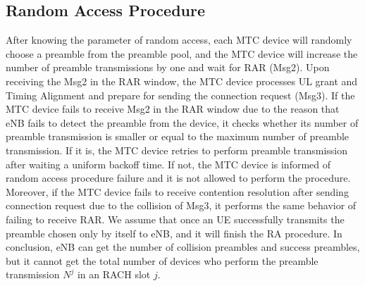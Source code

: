     \subsection{Random Access Procedure}
    After knowing the parameter of random access, each MTC device will randomly choose a preamble from the preamble pool, and the MTC device will increase the number of preamble transmissions by one and wait for RAR (Msg2). Upon receiving the Msg2 in the RAR window, the MTC device processes UL grant and Timing Alignment and prepare for sending the connection request (Msg3). If the MTC device fails to receive Msg2 in the RAR window due to the reason that eNB fails to detect the preamble from the device, it checks whether its number of preamble transmission is smaller or equal to the maximum number of preamble transmission. If it is, the MTC device retries to perform preamble transmission after waiting a uniform backoff time. If not, the MTC device is informed of random access procedure failure and it is not allowed to perform the procedure. Moreover, if the MTC device fails to receive contention resolution after sending connection request due to the collision of Msg3, it performs the same behavior of failing to receive RAR. We assume that once an UE successfully transmits the preamble chosen only by itself to eNB, and it will finish the RA procedure.
    In conclusion, eNB can get the number of collision preambles and success preambles, but it cannot get the total number of devices who perform the preamble transmission $N^j$ in an RACH slot $j$.

